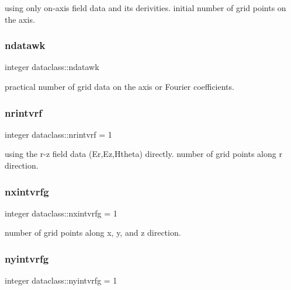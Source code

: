 using only on-\/axis field data and its derivities. initial number of grid points on the axis. 

\mbox{\label{namespacedataclass_ae1faef34fdc08790ab0a4d85650d797f}} 
\subsubsection{\texorpdfstring{ndatawk}{ndatawk}}
{\footnotesize\ttfamily integer dataclass\+::ndatawk}



practical number of grid data on the axis or Fourier coefficients. 

\mbox{\label{namespacedataclass_a3b9a2feb5ab8139d532626cad00a9769}} 
\subsubsection{\texorpdfstring{nrintvrf}{nrintvrf}}
{\footnotesize\ttfamily integer dataclass\+::nrintvrf = 1}



using the r-\/z field data (Er,Ez,Htheta) directly. number of grid points along r direction. 

\mbox{\label{namespacedataclass_a6302bc97206196f7003db67abd75507e}} 
\subsubsection{\texorpdfstring{nxintvrfg}{nxintvrfg}}
{\footnotesize\ttfamily integer dataclass\+::nxintvrfg = 1}



number of grid points along x, y, and z direction. 

\mbox{\label{namespacedataclass_a32c01f4c7d58343edc8d318b2e5f4760}} 
\subsubsection{\texorpdfstring{nyintvrfg}{nyintvrfg}}
{\footnotesize\ttfamily integer dataclass\+::nyintvrfg = 1}



